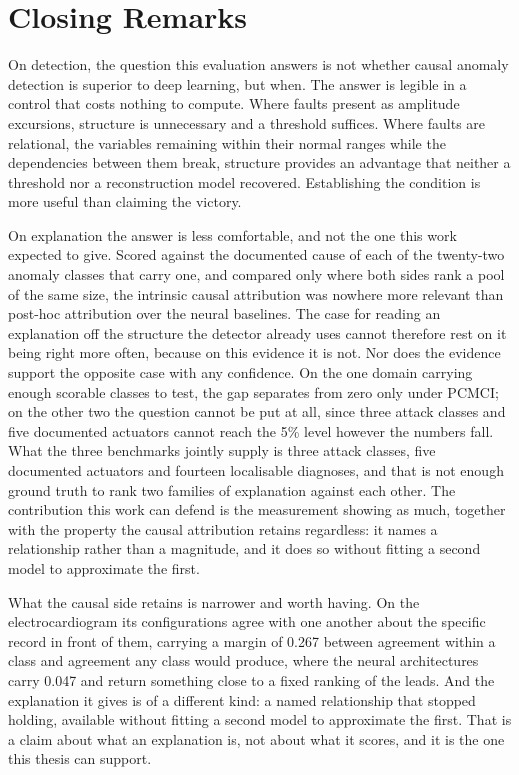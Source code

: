 \section{Closing Remarks}
\label{sec:conc-closing}

On detection, the question this evaluation answers is not whether causal anomaly detection is superior to deep learning, but when. The answer is legible in a control that costs nothing to compute. Where faults present as amplitude excursions, structure is unnecessary and a threshold suffices. Where faults are relational, the variables remaining within their normal ranges while the dependencies between them break, structure provides an advantage that neither a threshold nor a reconstruction model recovered. Establishing the condition is more useful than claiming the victory.

On explanation the answer is less comfortable, and not the one this work expected to give. Scored against the documented cause of each of the twenty-two anomaly classes that carry one, and compared only where both sides rank a pool of the same size, the intrinsic causal attribution was nowhere more relevant than post-hoc attribution over the neural baselines. The case for reading an explanation off the structure the detector already uses cannot therefore rest on it being right more often, because on this evidence it is not. Nor does the evidence support the opposite case with any confidence. On the one domain carrying enough scorable classes to test, the gap separates from zero only under PCMCI; on the other two the question cannot be put at all, since three attack classes and five documented actuators cannot reach the 5\% level however the numbers fall. What the three benchmarks jointly supply is three attack classes, five documented actuators and fourteen localisable diagnoses, and that is not enough ground truth to rank two families of explanation against each other. The contribution this work can defend is the measurement showing as much, together with the property the causal attribution retains regardless: it names a relationship rather than a magnitude, and it does so without fitting a second model to approximate the first.

What the causal side retains is narrower and worth having. On the electrocardiogram its configurations agree with one another about the specific record in front of them, carrying a margin of 0.267 between agreement within a class and agreement any class would produce, where the neural architectures carry 0.047 and return something close to a fixed ranking of the leads. And the explanation it gives is of a different kind: a named relationship that stopped holding, available without fitting a second model to approximate the first. That is a claim about what an explanation is, not about what it scores, and it is the one this thesis can support.
